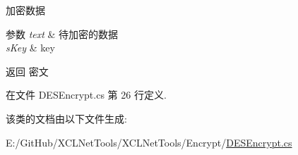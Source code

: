 加密数据 


\begin{DoxyParams}{参数}
{\em text} & 待加密的数据\\
\hline
{\em s\+Key} & key\\
\hline
\end{DoxyParams}
\begin{DoxyReturn}{返回}
密文
\end{DoxyReturn}


在文件 D\+E\+S\+Encrypt.\+cs 第 26 行定义.



该类的文档由以下文件生成\+:\begin{DoxyCompactItemize}
\item 
E\+:/\+Git\+Hub/\+X\+C\+L\+Net\+Tools/\+X\+C\+L\+Net\+Tools/\+Encrypt/\hyperlink{_d_e_s_encrypt_8cs}{D\+E\+S\+Encrypt.\+cs}\end{DoxyCompactItemize}
